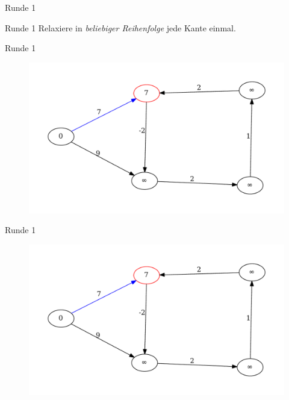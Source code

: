 \begin{frame}{Runde 1}
	\begin{block}{Runde 1}
	Relaxiere in \textit{beliebiger Reihenfolge} jede Kante einmal.
	\end{block}
\end{frame}

\begin{frame}{Runde 1}
\begin{figure}[htbp]
\centering
\includegraphics[width=\linewidth]{bellman_ford_graphs/graph_01.pdf}
\end{figure}
\end{frame}
\begin{frame}{Runde 1}
\begin{figure}[htbp]
\centering
\includegraphics[width=\linewidth]{bellman_ford_graphs/graph_01.pdf}
\end{figure}
\end{frame}


